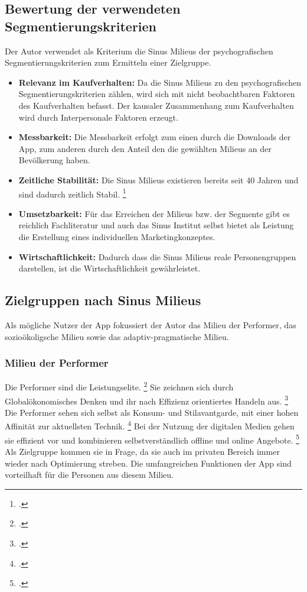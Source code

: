 \subsection{Bewertung der verwendeten Segmentierungskriterien}
Der Autor verwendet als Kriterium die Sinus Milieus der psychografischen Segmentierungskriterien zum Ermitteln einer Zielgruppe.

\begin{itemize}

\item \textbf{Relevanz im Kaufverhalten:} Da die Sinus Milieus zu den psychografischen Segmentierungskriterien zählen, wird sich mit nicht beobachtbaren Faktoren des Kaufverhalten befasst.  Der kausaler Zusammenhang zum Kaufverhalten wird durch Interpersonale Faktoren erzeugt. 
\item \textbf{Messbarkeit:} Die Messbarkeit erfolgt zum einen durch die Downloads der App, zum anderen durch den Anteil den die gewählten Milieus an der Bevölkerung haben. 
\item \textbf{Zeitliche Stabilität:} Die Sinus Milieus existieren bereits seit 40 Jahren und sind dadurch zeitlich Stabil. \footcite[Vgl.][ ]{website:sinus-institut}
\item \textbf{Umsetzbarkeit:} Für das Erreichen der Milieus bzw. der Segmente gibt es reichlich Fachliteratur und auch das Sinus Institut selbst bietet als Leistung die Erstellung eines individuellen Marketingkonzeptes.
\item \textbf{Wirtschaftlichkeit:} Dadurch dass die Sinus Milieus reale Personengruppen darstellen, ist die Wirtschaftlichkeit gewährleistet.

\end{itemize}

\subsection{Zielgruppen nach Sinus Milieus}
Als mögliche Nutzer der App fokussiert der Autor das Milieu der Performer, das sozioökoligsche Milieu sowie das adaptiv-pragmatische Milieu.

\subsubsection{Milieu der Performer}
Die Performer sind die Leistungselite. \footcite[Vgl.][ ]{website:sinus-institut}
Sie zeichnen sich durch Globalökonomisches Denken und ihr nach Effizienz orientiertes Handeln aus. \footcite[Vgl.][ ]{website:sinus-institut}
Die Performer sehen sich selbst als Konsum- und Stilavantgarde, mit einer hohen Affinität zur aktuellsten Technik. \footcite[Vgl.][ ]{website:sinus-institut}
Bei der Nutzung der digitalen Medien gehen sie effizient vor und kombinieren selbstverständlich offline und online Angebote. \footcite[Vgl.][ ]{website:sinus-institut}
Als Zielgruppe kommen sie in Frage, da sie auch im privaten Bereich immer wieder nach Optimierung streben. Die umfangreichen Funktionen der App sind vorteilhaft für die Personen aus diesem Milieu.

